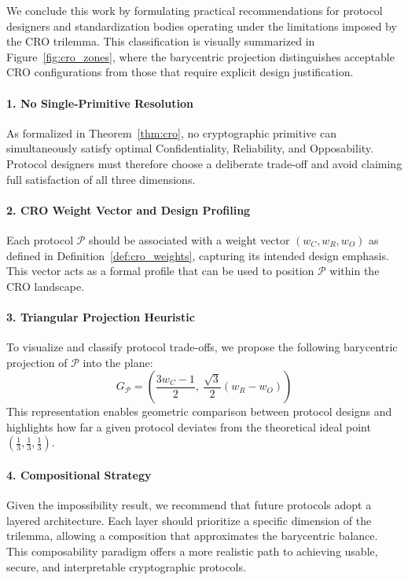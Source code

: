 \documentclass[preprint,12pt]{elsarticle}
\begin{document}
            We conclude this work by formulating practical recommendations for protocol designers and standardization bodies operating under the limitations imposed by the CRO trilemma.
            This classification is visually summarized in Figure~\ref{fig:cro_zones}, where the barycentric projection distinguishes acceptable CRO configurations from those that require explicit design justification.

            \paragraph{1. No Single-Primitive Resolution}
                As formalized in Theorem~\ref{thm:cro}, no cryptographic primitive can simultaneously satisfy optimal Confidentiality, Reliability, and Opposability. Protocol designers must therefore choose a deliberate trade-off and avoid claiming full satisfaction of all three dimensions.

                \paragraph{2. CRO Weight Vector and Design Profiling}
                Each protocol $\mathcal{P}$ should be associated with a weight vector $(w_C, w_R, w_O)$ as defined in Definition~\ref{def:cro_weights}, capturing its intended design emphasis. This vector acts as a formal profile that can be used to position $\mathcal{P}$ within the CRO landscape.

            \paragraph{3. Triangular Projection Heuristic}
                To visualize and classify protocol trade-offs, we propose the following barycentric projection of $\mathcal{P}$ into the plane:
                \begin{equation}\label{eq:triangular_projection_heuristic}
                    G_{\mathcal{P}} =
                    \left(
                    \frac{3w_C - 1}{2},\ 
                    \frac{\sqrt{3}}{2}(w_R - w_O)
                    \right)
                \end{equation}
                This representation enables geometric comparison between protocol designs and highlights how far a given protocol deviates from the theoretical ideal point $(\tfrac{1}{3}, \tfrac{1}{3}, \tfrac{1}{3})$.

            \paragraph{4. Compositional Strategy}
                Given the impossibility result, we recommend that future protocols adopt a layered architecture. Each layer should prioritize a specific dimension of the trilemma, allowing a composition that approximates the barycentric balance. This composability paradigm offers a more realistic path to achieving usable, secure, and interpretable cryptographic protocols.
\end{document}
